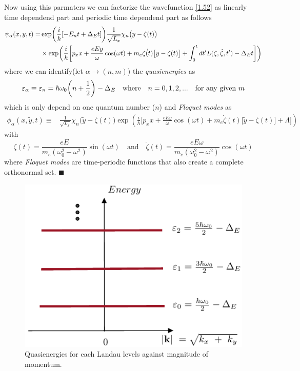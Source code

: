 \noindent
Now using this parmaters we can factorize the wavefunction \eqref{1.52} as linearly time dependend part and periodic time dependend part as follows
\begin{equation} \label{3.13}
  \begin{aligned}
    \psi_{\alpha}(x,y,t)  = &
    \exp(\frac{i}{\hbar}\qty[-E_nt + \Delta_E t ])
    \frac{1}{\sqrt{L_x}} \chi_n\big(y - \zeta(t)\big)
    \\
    & \times
    \exp(
     \frac{i}{\hbar}\bigg[
     p_x x +
     \frac{eEy}{\omega}\cos(\omega t)+
     m_e\dot{\zeta(t)}\big[y-\zeta(t)\big]
     + \int_0^{t}dt'L(\zeta,\dot{\zeta},t') - \Delta_E t  \bigg])
  \end{aligned}
\end{equation}
where we can identify(let $\alpha \rightarrow (n,m)$) the \textit{quasienergies} as
\begin{equation} \label{3.14}
  \varepsilon_{\alpha} \equiv
  \varepsilon_{n} =
  \hbar \omega_0\qty(n + \frac{1}{2}) - \Delta_E \quad \text{where} \quad
  n = 0,1,2, ... \quad \text{for any given } m
\end{equation}
which is only depend on one quantum number ($n$) and \textit{Floquet modes} as
\begin{equation} \label{3.15}
  \begin{aligned}
    \phi_{\alpha}(x,\tilde{y},t) \equiv &
    \frac{1}{\sqrt{L_x}} \chi_{n}\big(\tilde{y} - \zeta(t)\big)
    \exp(
     \frac{i}{\hbar}\bigg[
     p_x x +
     \frac{eE\tilde{y}}{\omega}\cos(\omega t)+
     m_e\dot{\zeta}(t)\big[\tilde{y}-\zeta(t)\big]
     + \Lambda \bigg])
  \end{aligned}
\end{equation}
with
\begin{equation} \label{3.16}
  \zeta(t) = \frac{eE}{m_e(\omega_0^2 - \omega^2)}\sin(\omega t) \quad \text{and} \quad
  \dot{\zeta}(t) = \frac{eE\omega}{m_e(\omega_0^2 - \omega^2)}\cos(\omega t)
\end{equation}
where  \textit{Floquet modes} are time-periodic functions that also create a complete orthonormal set.
\hfill$\blacksquare$
\begin{figure}[ht!]
  \centering
  \includegraphics[scale=0.9]{figures/fig03.pdf}
  \caption{Quasienergies for each Landau levels against magnitude of momentum.}
  \label{fig:1.0}
\end{figure}

